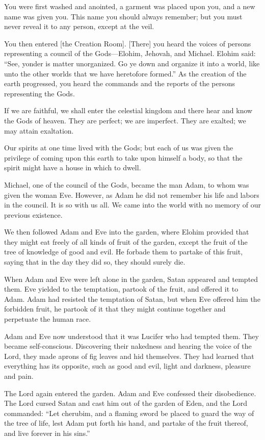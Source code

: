 				You were first washed and anointed, a garment was placed upon you, and a new name was given you. This name you should always remember; but you must never reveal it to any person, except at the veil.

				You then entered [the Creation Room]. [There] you heard the voices of persons representing a council of the Gods---Elohim, Jehovah, and Michael. Elohim said: ``See, yonder is matter unorganized. Go ye down and organize it into a world, like unto the other worlds that we have heretofore formed.'' As the creation of the earth progressed, you heard the commands and the reports of the persons representing the Gods.

				If we are faithful, we shall enter the celestial kingdom and there hear and know the Gods of heaven. They are perfect; we are imperfect. They are exalted; we may attain exaltation.

				Our spirits at one time lived with the Gods; but each of us was given the privilege of coming upon this earth to take upon himself a body, so that the spirit might have a house in which to dwell.

				Michael, one of the council of the Gods, became the man Adam, to whom was given the woman Eve. However, as Adam he did not remember his life and labors in the council. It is so with us all. We came into the world with no memory of our previous existence.

				We then followed Adam and Eve into the garden, where Elohim provided that they might eat freely of all kinds of fruit of the garden, except the fruit of the tree of knowledge of good and evil. He forbade them to partake of this fruit, saying that in the day they did so, they should surely die.

				When Adam and Eve were left alone in the garden, Satan appeared and tempted them. Eve yielded to the temptation, partook of the fruit, and offered it to Adam. Adam had resisted the temptation of Satan, but when Eve offered him the forbidden fruit, he partook of it that they might continue together and perpetuate the human race.

				Adam and Eve now understood that it was Lucifer who had tempted them. They became self-conscious. Discovering their nakedness and hearing the voice of the Lord, they made aprons of fig leaves and hid themselves. They had learned that everything has its opposite, such as good and evil, light and darkness, pleasure and pain.

				The Lord again entered the garden. Adam and Eve confessed their disobedience. The Lord cursed Satan and cast him out of the garden of Eden, and the Lord commanded: ``Let cherubim, and a flaming sword be placed to guard the way of the tree of life, lest Adam put forth his hand, and partake of the fruit thereof, and live forever in his sins.''


